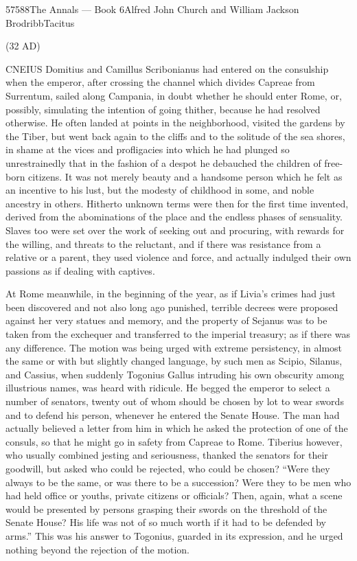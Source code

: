 57588The Annals — Book 6Alfred John Church and William Jackson BrodribbTacitus


(32 AD)

CNEIUS Domitius and Camillus Scribonianus had entered on the consulship when the emperor, after crossing the channel which divides Capreae from Surrentum, sailed along Campania, in doubt whether he should enter Rome, or, possibly, simulating the intention of going thither, because he had resolved otherwise. He often landed at points in the neighborhood, visited the gardens by the Tiber, but went back again to the cliffs and to the solitude of the sea shores, in shame at the vices and profligacies into which he had plunged so unrestrainedly that in the fashion of a despot he debauched the children of free-born citizens. It was not merely beauty and a handsome person which he felt as an incentive to his lust, but the modesty of childhood in some, and noble ancestry in others. Hitherto unknown terms were then for the first time invented, derived from the abominations of the place and the endless phases of sensuality. Slaves too were set over the work of seeking out and procuring, with rewards for the willing, and threats to the reluctant, and if there was resistance from a relative or a parent, they used violence and force, and actually indulged their own passions as if dealing with captives.


At Rome meanwhile, in the beginning of the year, as if Livia's crimes had just been discovered and not also long ago punished, terrible decrees were proposed against her very statues and memory, and the property of Sejanus was to be taken from the exchequer and transferred to the imperial treasury; as if there was any difference. The motion was being urged with extreme persistency, in almost the same or with but slightly changed language, by such men as Scipio, Silanus, and Cassius, when suddenly Togonius Gallus intruding his own obscurity among illustrious names, was heard with ridicule. He begged the emperor to select a number of senators, twenty out of whom should be chosen by lot to wear swords and to defend his person, whenever he entered the Senate House. The man had actually believed a letter from him in which he asked the protection of one of the consuls, so that he might go in safety from Capreae to Rome. Tiberius however, who usually combined jesting and seriousness, thanked the senators for their goodwill, but asked who could be rejected, who could be chosen? ``Were they always to be the same, or was there to be a succession? Were they to be men who had held office or youths, private citizens or officials? Then, again, what a scene would be presented by persons grasping their swords on the threshold of the Senate House? His life was not of so much worth if it had to be defended by arms.'' This was his answer to Togonius, guarded in its expression, and he urged nothing beyond the rejection of the motion.

